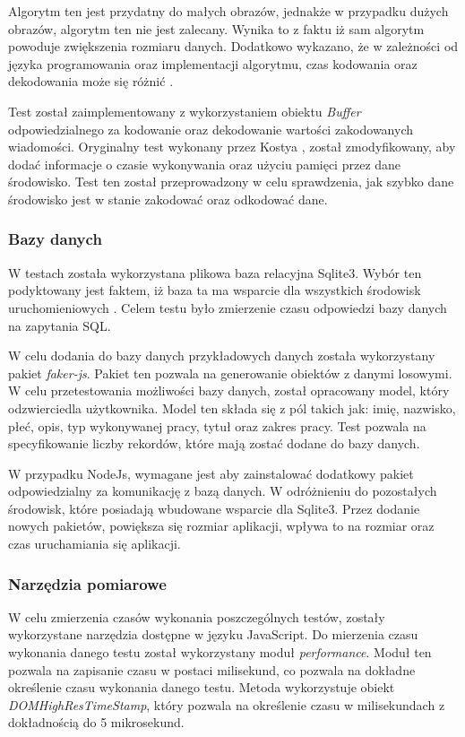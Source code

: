 Algorytm ten jest przydatny do małych obrazów, jednakże w przypadku dużych obrazów, algorytm ten nie jest zalecany. Wynika to z faktu iż sam algorytm powoduje zwiększenia rozmiaru danych. Dodatkowo wykazano, że w zależności od języka programowania oraz implementacji algorytmu, czas kodowania oraz dekodowania może się różnić \cite{cryptoeprint:2022/361}.

Test został zaimplementowany z wykorzystaniem obiektu \textit{Buffer} odpowiedzialnego za kodowanie oraz dekodowanie wartości zakodowanych wiadomości. Oryginalny test wykonany przez Kostya \cite{base64_benchmark}, został zmodyfikowany, aby dodać informacje o czasie wykonywania oraz użyciu pamięci przez dane środowisko. Test ten został przeprowadzony w celu sprawdzenia, jak szybko dane środowisko jest w stanie zakodować oraz odkodować dane.

\subsubsection{Bazy danych}
W testach została wykorzystana plikowa baza relacyjna Sqlite3. Wybór ten podyktowany jest faktem, iż baza ta ma wsparcie dla wszystkich środowisk uruchomieniowych \cite{sqlite}. Celem testu było zmierzenie czasu odpowiedzi bazy danych na zapytania SQL. 

W celu dodania do bazy danych przykładowych danych została wykorzystany pakiet \textit{faker-js}. Pakiet ten pozwala na generowanie obiektów z danymi losowymi. W celu przetestowania możliwości bazy danych, został opracowany model, który odzwierciedla użytkownika. Model ten składa się z pól takich jak: imię, nazwisko, płeć, opis, typ wykonywanej pracy, tytuł oraz zakres pracy. Test pozwala na specyfikowanie liczby rekordów, które mają zostać dodane do bazy danych.

W przypadku NodeJs, wymagane jest aby zainstalować dodatkowy pakiet odpowiedzialny za komunikację z bazą danych. W odróżnieniu do pozostałych środowisk, które posiadają wbudowane wsparcie dla Sqlite3. Przez dodanie nowych pakietów, powiększa się rozmiar aplikacji, wpływa to na rozmiar oraz czas uruchamiania się aplikacji.

\subsubsection{Narzędzia pomiarowe}
W celu zmierzenia czasów wykonania poszczególnych testów, zostały wykorzystane narzędzia dostępne w języku JavaScript. Do mierzenia czasu wykonania danego testu został wykorzystany moduł \textit{performance}. Moduł ten pozwala na zapisanie czasu w postaci milisekund, co pozwala na dokładne określenie czasu wykonania danego testu. Metoda wykorzystuje obiekt \textit{DOMHighResTimeStamp}, który pozwala na określenie czasu w milisekundach z dokładnością do 5 mikrosekund.

